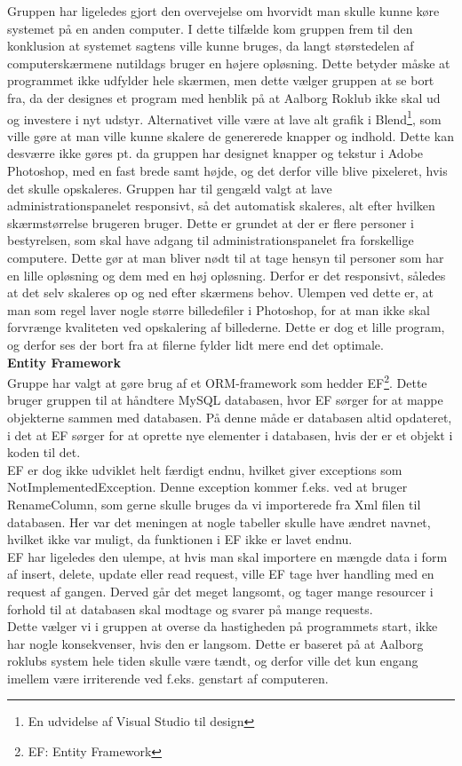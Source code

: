 Gruppen har ligeledes gjort den overvejelse om hvorvidt man skulle kunne køre systemet på en anden computer. I dette tilfælde kom gruppen frem til den konklusion at systemet sagtens ville kunne bruges, da langt størstedelen af computerskærmene nutildags bruger en højere opløsning. Dette betyder måske at programmet ikke udfylder hele skærmen, men dette vælger gruppen at se bort fra, da der designes et program med henblik på at Aalborg Roklub ikke skal ud og investere i nyt udstyr. Alternativet ville være at lave alt grafik i Blend\footnote{En udvidelse af Visual Studio til design}, som ville gøre at man ville kunne skalere de genererede knapper og indhold. Dette kan desværre ikke gøres pt. da gruppen har designet knapper og tekstur i Adobe Photoshop, med en fast brede samt højde, og det derfor ville blive pixeleret, hvis det skulle opskaleres. Gruppen har til gengæld valgt at lave administrationspanelet responsivt, så det automatisk skaleres, alt efter hvilken skærmstørrelse brugeren bruger. Dette er grundet at der er flere personer i bestyrelsen, som skal have adgang til administrationspanelet fra forskellige computere. Dette gør at man bliver nødt til at tage hensyn til personer som har en lille opløsning og dem med en høj opløsning. Derfor er det responsivt, således at det selv skaleres op og ned efter skærmens behov.
Ulempen ved dette er, at man som regel laver nogle større billedefiler i Photoshop, for at man ikke skal forvrænge kvaliteten ved opskalering af billederne. Dette er dog et lille program, og derfor ses der bort fra at filerne fylder lidt mere end det optimale.\\

\textbf{Entity Framework}\\
Gruppe har valgt at gøre brug af et ORM-framework som hedder EF\footnote{EF: Entity Framework}.
Dette bruger gruppen til at håndtere MySQL databasen, hvor EF sørger for at mappe objekterne sammen med databasen. På denne måde er databasen altid opdateret, i det at EF sørger for at oprette nye elementer i databasen, hvis der er et objekt i koden til det.\\

EF er dog ikke udviklet helt færdigt endnu, hvilket giver exceptions som NotImplementedException. Denne exception kommer f.eks. ved at bruger RenameColumn, som gerne skulle bruges da vi importerede fra Xml filen til databasen. Her var det meningen at nogle tabeller skulle have ændret navnet, hvilket ikke var muligt, da funktionen i EF ikke er lavet endnu.\\ EF har ligeledes den ulempe, at hvis man skal importere en mængde data i form af insert, delete, update eller read request, ville EF tage hver handling med en request af gangen. Derved går det meget langsomt, og tager mange resourcer i forhold til at databasen skal modtage og svarer på mange requests.\\
Dette vælger vi i gruppen at overse da hastigheden på programmets start, ikke har nogle konsekvenser, hvis den er langsom. Dette er baseret på at Aalborg roklubs system hele tiden skulle være tændt, og derfor ville det kun engang imellem være irriterende ved f.eks. genstart af computeren.\\

